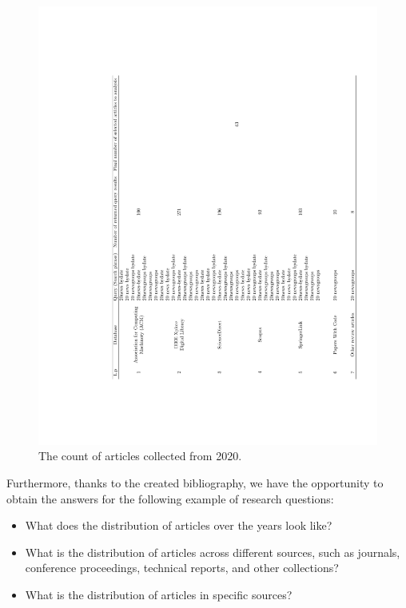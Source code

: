 \documentclass[
]{article}
\providecommand{\tightlist}{%
  \setlength{\itemsep}{0pt}\setlength{\parskip}{0pt}}
\begin{document}
\begin{figure}

{\centering \includegraphics[width=1\linewidth]{../../tables/latex/table-data-to-review-2-2} 

}

\caption{The count of articles collected from 2020.}\label{fig:sumFrom2020}
\end{figure}

Furthermore, thanks to the created bibliography, we have the opportunity to obtain the answers for the following example of research
questions:

\begin{itemize}
\tightlist
\item
  What does the distribution of articles over the years look like?
\item
  What is the distribution of articles across different sources, such as journals, conference proceedings, technical reports, and other collections?
\item
  What is the distribution of articles in specific sources?
\end{itemize}
\end{document}
